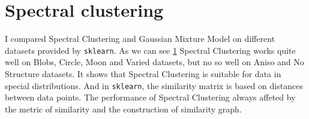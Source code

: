 \documentclass{article}
\begin{document}
\section{Spectral clustering}
\par
I compared Spectral Clustering and Gaussian Mixture Model on different datasets provided by \texttt{sklearn}. 
As we can see \ref{fig:sp} Spectral Clustering works quite well on Blobs, Circle, Moon and Varied datasets, but no so well on Aniso and No Structure datasets.
It shows that Spectral Clustering is suitable for data in special distributions. And in \texttt{sklearn}, the similarity matrix is based on distances between data points.
The performance of Spectral Clustering always affeted by the metric of similarity and the construction of similarity graph.
\begin{figure}[htbp]
  \label{fig:sp}%
  \centering


\end{figure}
\end{document}
